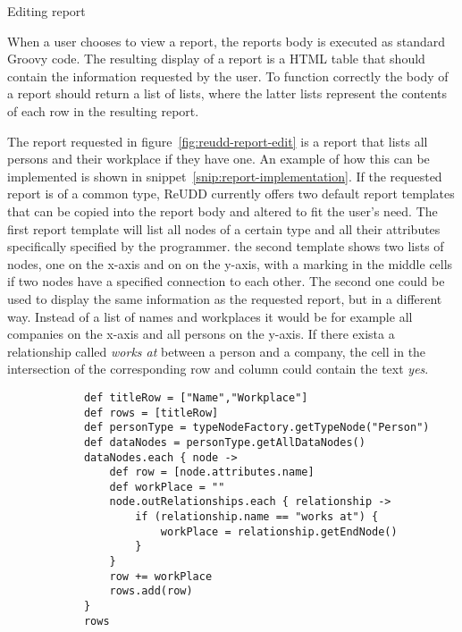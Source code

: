 \documentclass[a4paper]{report}
\begin{document}
	{Editing report}

When a user chooses to view a report, the reports body is executed as standard Groovy code. The resulting display of a report is a HTML table that should contain the information requested by the user. To function correctly the body of a report should return a list of lists, where the latter lists represent the contents of each row in the resulting report.

The report requested in figure~\ref{fig:reudd-report-edit} is a report that lists all persons and their workplace if they have one. An example of how this can be implemented is shown in snippet~\ref{snip:report-implementation}. If the requested report is of a common type, ReUDD currently offers two default report templates that can be copied into the report body and altered to fit the user's need. The first report template will list all nodes of a certain type and all their attributes specifically specified by the programmer. the second template shows two lists of nodes, one on the x-axis and on on the y-axis, with a marking in the middle cells if two nodes have a specified connection to each other. The second one could be used to display the same information as the requested report, but in a different way. Instead of a list of names and workplaces it would be for example all companies on the x-axis and all persons on the y-axis. If there exista a relationship called \emph{works at} between a person and a company, the cell in the intersection of the corresponding row and column could contain the text \emph{yes}.

\begin{snippet}
	\center
	\begin{minipage}[h]{0.9\linewidth}
		\begin{verbatim}
			def titleRow = ["Name","Workplace"]
			def rows = [titleRow]
			def personType = typeNodeFactory.getTypeNode("Person")
			def dataNodes = personType.getAllDataNodes()
			dataNodes.each { node ->
			    def row = [node.attributes.name]
			    def workPlace = ""
			    node.outRelationships.each { relationship ->
			        if (relationship.name == "works at") {
			            workPlace = relationship.getEndNode()
			        }
			    }
			    row += workPlace
			    rows.add(row)
			}
			rows
		\end{verbatim}
	\end{minipage}
	\caption{Example implementation of a report body}
	\label{snip:report-implementation}
\end{snippet}
\end{document}
